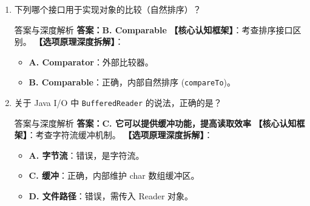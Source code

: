 ﻿\documentclass[12pt, a4paper]{ctexart}
\newcommand{\code}[1]{\texttt{#1}}
\begin{document}
\begin{enumerate}[label=\arabic*., itemsep=1.5em]
	\item 下列哪个接口用于实现对象的比较（自然排序）？
	      \begin{bluebox}{答案与深度解析}
		      \textbf{答案：B. Comparable}
		      \textbf{【核心认知框架】}：考查排序接口区别。
		      \textbf{【选项原理深度拆解】}：
		      \begin{itemize}[leftmargin=*, nosep]
			      \item \textbf{A. Comparator}：外部比较器。
			      \item \textbf{B. Comparable}：正确，内部自然排序 (\code{compareTo})。
		      \end{itemize}
	      \end{bluebox}

	\item 关于 Java I/O 中 \code{BufferedReader} 的说法，正确的是？
	      \begin{bluebox}{答案与深度解析}
		      \textbf{答案：C. 它可以提供缓冲功能，提高读取效率}
		      \textbf{【核心认知框架】}：考查字符流缓冲机制。
		      \textbf{【选项原理深度拆解】}：
		      \begin{itemize}[leftmargin=*, nosep]
			      \item \textbf{A. 字节流}：错误，是字符流。
			      \item \textbf{C. 缓冲}：正确，内部维护 char 数组缓冲区。
			      \item \textbf{D. 文件路径}：错误，需传入 Reader 对象。
		      \end{itemize}
	      \end{bluebox}


\end{enumerate}
\end{document}
